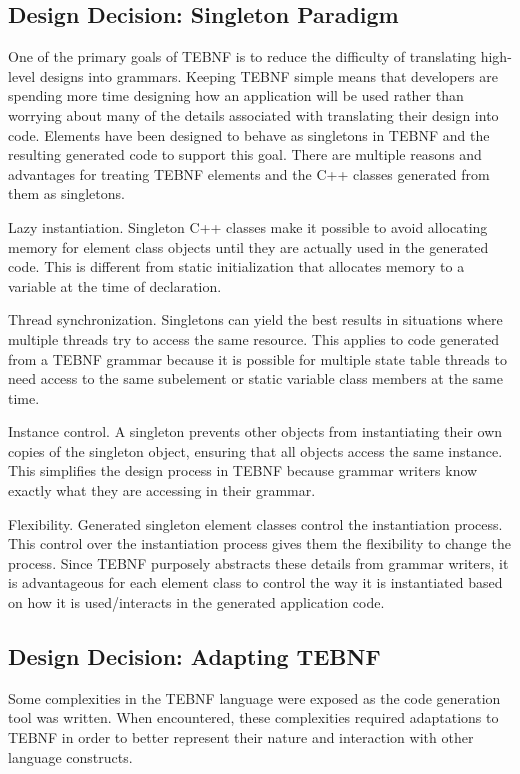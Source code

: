 \subsection{Design Decision: Singleton Paradigm}
One of the primary goals of TEBNF is to reduce the difficulty of translating high-level designs into grammars.  Keeping TEBNF simple means that developers are spending more time designing how an application will be used rather than worrying about many of the details associated with translating their design into code.   Elements have been designed to behave as singletons in TEBNF and the resulting generated code to support this goal.  There are multiple reasons and advantages for treating TEBNF elements and the C++ classes generated from them as singletons.

\indent
Lazy instantiation.  Singleton C++ classes make it possible to avoid allocating memory for element class objects until they are actually used in the generated code.  This is different from static initialization that allocates memory to a variable at the time of declaration.

\indent
Thread synchronization.   Singletons can yield the best results in situations where multiple threads try to access the same resource.  This applies to code generated from a TEBNF grammar because it is possible for multiple state table threads to need access to the same subelement or static variable class members at the same time.

\indent
Instance control.  A singleton prevents other objects from instantiating their own copies of the singleton object, ensuring that all objects access the same instance.  This simplifies the design process in TEBNF because grammar writers know exactly what they are accessing in their grammar.

\indent
Flexibility.  Generated singleton element classes control the instantiation process.  This control over the instantiation process gives them the flexibility to change the process.  Since TEBNF purposely abstracts these details from grammar writers, it is advantageous for each element class to control the way it is instantiated based on how it is used/interacts in the generated application code.

\subsection{Design Decision: Adapting TEBNF}
Some complexities in the TEBNF language were exposed as the code generation tool was written.  When encountered, these complexities required adaptations to TEBNF in order to better represent their nature and interaction with other language constructs.

